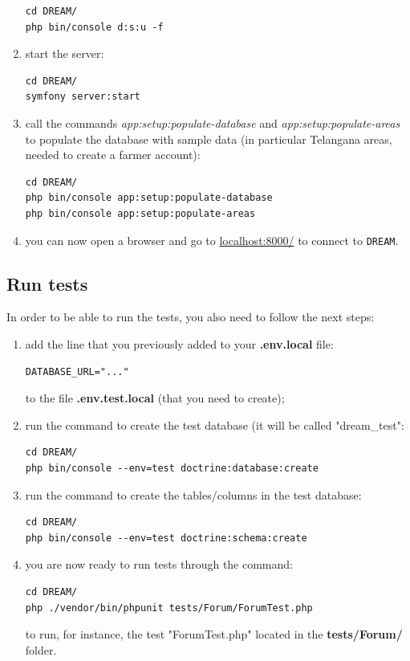 \documentclass{article}
\begin{document}
\begin{enumerate}
    \begin{verbatim}
cd DREAM/
php bin/console d:s:u -f
    \end{verbatim}
    \item start the server:
    \begin{verbatim}
cd DREAM/
symfony server:start
    \end{verbatim}
    \item call the commands \textit{app:setup:populate-database} and \textit{app:setup:populate-areas} to populate the database with sample data (in particular Telangana areas, needed to create a farmer account):
    \begin{verbatim}
cd DREAM/
php bin/console app:setup:populate-database
php bin/console app:setup:populate-areas
    \end{verbatim}
\item you can now open a browser and go to \url{localhost:8000/} to connect to \verb|DREAM|.
\end{enumerate}
\subsection{Run tests}
In order to be able to run the tests, you also need to follow the next steps:
\begin{enumerate}
    \item add the line that you previously added to your \textbf{.env.local} file:
\begin{verbatim}
DATABASE_URL="..."
\end{verbatim}
to the file \textbf{.env.test.local} (that you need to create);
\item run the command to create the test database (it will be called "dream\_test":
\begin{verbatim}
cd DREAM/
php bin/console --env=test doctrine:database:create
\end{verbatim}
\item run the command to create the tables/columns in the test database:
\begin{verbatim}
cd DREAM/
php bin/console --env=test doctrine:schema:create
\end{verbatim}
\item you are now ready to run tests through the command:
\begin{verbatim}
cd DREAM/
php ./vendor/bin/phpunit tests/Forum/ForumTest.php
\end{verbatim}
to run, for instance, the test "ForumTest.php" located in the \textbf{tests/Forum/} folder.
\end{enumerate}
\newpage
\end{document}
